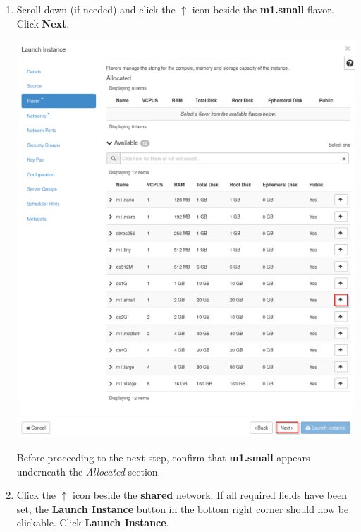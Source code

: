 \documentclass[letterpaper, 12pt]{article}
\begin{document}
\begin{enumerate}
    \item Scroll down (if needed) and click the $\uparrow$ icon beside the \textbf{m1.small} flavor. Click
    \textbf{Next}.
    
    \begin{center}
        \includegraphics[width=\linewidth]{images/part1/step8.png}
    \end{center}

    \begin{stopbox}{}
        Before proceeding to the next step, confirm that \textbf{m1.small} appears underneath the \textit{Allocated}
        section.
    \end{stopbox}

    \item Click the $\uparrow$ icon beside the \textbf{shared} network. If all required fields have been set, the
    \textbf{Launch Instance} button in the bottom right corner should now be clickable. Click \textbf{Launch Instance}.


\end{enumerate}
\end{document}
